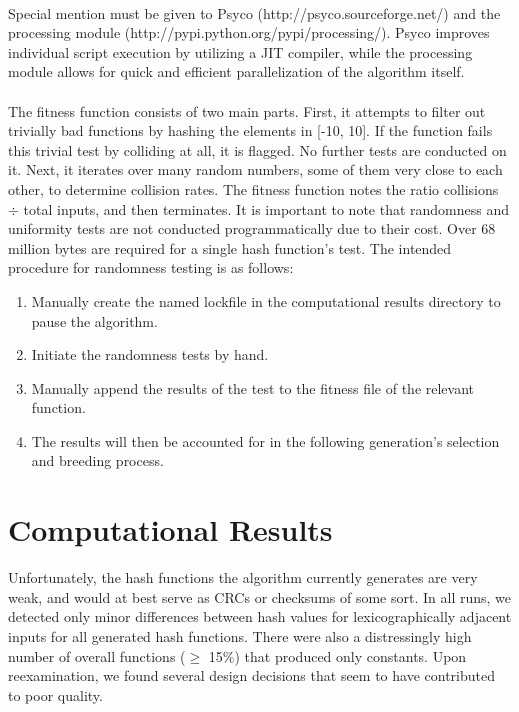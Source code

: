 \documentclass{article}
\begin{document}
\paragraph{}
Special mention must be given to Psyco (http://psyco.sourceforge.net/) and the processing module (http://pypi.python.org/pypi/processing/). Psyco improves individual script execution by utilizing a JIT compiler, while the processing module allows for quick and efficient parallelization of the algorithm itself.

\paragraph{}
The fitness function consists of two main parts. First, it attempts to filter out trivially bad functions by hashing the elements in [-10, 10]. If the function fails this trivial test by colliding at all, it is flagged. No further tests are conducted on it.
Next, it iterates over many random numbers, some of them very close to each other, to determine collision rates.
The fitness function notes the ratio collisions $\div$ total inputs, and then terminates.
It is important to note that randomness and uniformity tests are not conducted programmatically due to their cost. Over 68 million bytes are required for a single hash function's test. The intended procedure for randomness testing is as follows: 
\begin{enumerate}
	\item Manually create the named lockfile in the computational results directory to pause the algorithm.
	\item Initiate the randomness tests by hand.
	\item Manually append the results of the test to the fitness file of the relevant function. 
	\item The results will then be accounted for in the following generation's selection and breeding process.
\end{enumerate}

\section{Computational Results}
Unfortunately, the hash functions the algorithm currently generates are very weak, and would at best serve as CRCs or checksums of some sort. In all runs, we detected only minor differences between hash values for lexicographically adjacent inputs for all generated hash functions.
There were also a distressingly high number of overall functions ($\geq$ 15\%) that produced only constants. Upon reexamination, we found several design decisions that seem to have contributed to poor quality.
\end{document}
